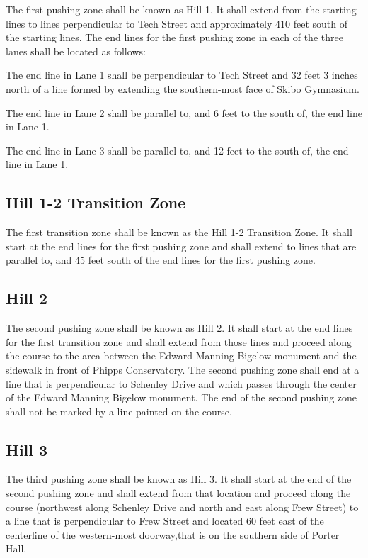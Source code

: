 	The first pushing zone shall be known as Hill 1. It shall extend from the
	starting lines to lines perpendicular to Tech Street and approximately 410 feet
	south of the starting lines. The end lines for the first pushing zone in each
	of the three lanes shall be located as follows:

	The end line in Lane 1 shall be perpendicular to Tech Street and 32 feet 3
	inches north of a line formed by extending the southern-most face of Skibo
	Gymnasium.

	The end line in Lane 2 shall be parallel to, and 6 feet to the south of, the
	end line in Lane 1.

	The end line in Lane 3 shall be parallel to, and 12 feet to the south of, the
	end line in Lane 1.

\subsection{Hill 1-2 Transition Zone}

	The first transition zone shall be known as the Hill 1-2 Transition Zone. It
	shall start at the end lines for the first pushing zone and shall extend to
	lines that are parallel to, and 45 feet south of the end lines for the first
	pushing zone.

\subsection{Hill 2}

	The second pushing zone shall be known as Hill 2. It shall start at the end
	lines for the first transition zone and shall extend from those lines and
	proceed along the course to the area between the Edward Manning Bigelow
	monument and the sidewalk in front of Phipps Conservatory. The second pushing
	zone shall end at a line that is perpendicular to Schenley Drive and which
	passes through the center of the Edward Manning Bigelow monument. The end of
	the second pushing zone shall not be marked by a line painted on the course.

\subsection{Hill 3}

	The third pushing zone shall be known as Hill 3. It shall start at the end of
	the second pushing zone and shall extend from that location and proceed along
	the course (northwest along Schenley Drive and north and east along Frew
	Street) to a line that is perpendicular to Frew Street and located 60 feet east
	of the centerline of the western-most doorway,that is on the southern side of
	Porter Hall.

